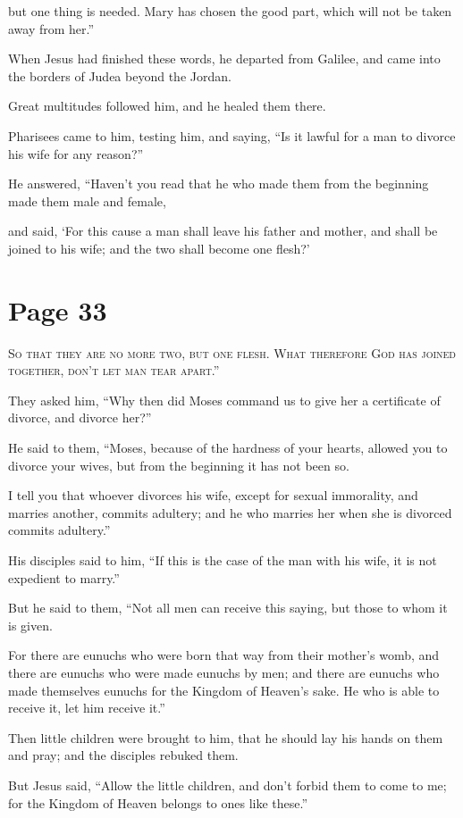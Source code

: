 but one thing is needed. Mary has chosen the good part, which will not be taken away from her.”

When Jesus had finished these words, he departed from Galilee, and came into the borders of Judea beyond the Jordan.

Great multitudes followed him, and he healed them there.

Pharisees came to him, testing him, and saying, “Is it lawful for a man to divorce his wife for any reason?”

He answered, “Haven’t you read that he who made them from the beginning made them male and female,

and said, ‘For this cause a man shall leave his father and mother, and shall be joined to his wife; and the two shall become one flesh?’



\chapterornament
\section*{Page 33}

\lettrine{S}{o that they are no more two, but one flesh. What therefore God has joined together, don’t let man tear apart.”}

They asked him, “Why then did Moses command us to give her a certificate of divorce, and divorce her?”

He said to them, “Moses, because of the hardness of your hearts, allowed you to divorce your wives, but from the beginning it has not been so.

I tell you that whoever divorces his wife, except for sexual immorality, and marries another, commits adultery; and he who marries her when she is divorced commits adultery.”

His disciples said to him, “If this is the case of the man with his wife, it is not expedient to marry.”

But he said to them, “Not all men can receive this saying, but those to whom it is given.

For there are eunuchs who were born that way from their mother’s womb, and there are eunuchs who were made eunuchs by men; and there are eunuchs who made themselves eunuchs for the Kingdom of Heaven’s sake. He who is able to receive it, let him receive it.”

Then little children were brought to him, that he should lay his hands on them and pray; and the disciples rebuked them.

But Jesus said, “Allow the little children, and don’t forbid them to come to me; for the Kingdom of Heaven belongs to ones like these.”

